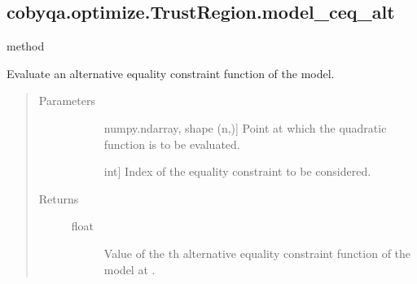 \documentclass[letterpaper,10pt,english]{sphinxmanual}
\begin{document}
\begin{fulllineitems}
\begin{fulllineitems}
\end{fulllineitems}



\subsection{cobyqa.optimize.TrustRegion.model\_ceq\_alt}
\label{\detokenize{refs/generated/cobyqa.optimize.TrustRegion.model_ceq_alt:cobyqa-optimize-trustregion-model-ceq-alt}}\label{\detokenize{refs/generated/cobyqa.optimize.TrustRegion.model_ceq_alt::doc}}
\sphinxAtStartPar
method

\begin{fulllineitems}
\label{\detokenize{refs/generated/cobyqa.optimize.TrustRegion.model_ceq_alt:cobyqa.optimize.TrustRegion.model_ceq_alt}}
\sphinxAtStartPar
Evaluate an alternative equality constraint function of the model.
\begin{quote}\begin{description}
\item[{Parameters}] \leavevmode\begin{description}
\item[{}] \leavevmode{[}numpy.ndarray, shape (n,){]}
\sphinxAtStartPar
Point at which the quadratic function is to be evaluated.

\item[{}] \leavevmode{[}int{]}
\sphinxAtStartPar
Index of the equality constraint to be considered.

\end{description}

\item[{Returns}] \leavevmode\begin{description}
\item[{float}] \leavevmode
\sphinxAtStartPar
Value of the \sphinxhyphen{}th alternative equality constraint function of the
model at .

\end{description}

\end{description}\end{quote}


\end{fulllineitems}
\end{fulllineitems}
\end{document}
